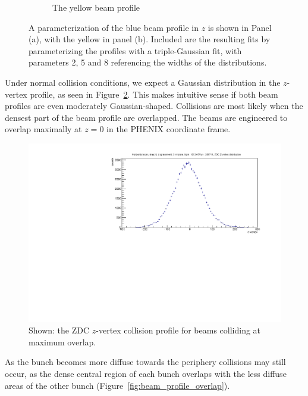 \begin{figure}
\begin{subfigure}[b]{0.8\textwidth}
    \caption{The yellow beam profile}
  \end{subfigure}
  \caption{
    A parameterization of the blue beam profile in $z$ is shown in Panel (a),
    with the yellow in panel (b). Included are the resulting fits by
    parameterizing the profiles with a triple-Gaussian fit, with parameters 2, 5
    and 8 referencing the widths of the distributions.
  }
  \label{fig:z_profile}
\end{figure}

Under normal collision conditions, we expect a Gaussian distribution in the
$z$-vertex profile, as seen in Figure~\ref{fig:zdc_zprofile_max_overlap}. This
makes intuitive sense if both beam profiles are even moderately
Gaussian-shaped. Collisions are most likely when the densest part of the beam
profile are overlapped. The beams are engineered to overlap maximally at $z=0$
in the PHENIX coordinate frame.

\begin{figure}[ht]
  \centering
  \includegraphics[width=0.8\linewidth]{./figures/zdc_zvtx_max_overlap_359711.pdf}
  \caption{
    Shown: the ZDC $z$-vertex collision profile for beams colliding at maximum
    overlap. 
  }
  \label{fig:zdc_zprofile_max_overlap}
\end{figure}

As the bunch becomes more diffuse towards the periphery collisions may still
occur, as the dense central region of each bunch overlaps with the less diffuse
areas of the other bunch (Figure~\ref{fig:beam_profile_overlap}).

